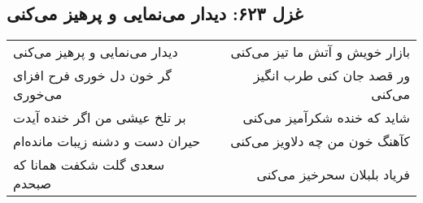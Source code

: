 \begin{center}
\section*{غزل ۶۲۳: دیدار می‌نمایی و پرهیز می‌کنی}
\label{sec:623}
\begin{longtable}{l p{0.5cm} r}
دیدار می‌نمایی و پرهیز می‌کنی
&&
بازار خویش و آتش ما تیز می‌کنی
\\
گر خون دل خوری فرح افزای می‌خوری
&&
ور قصد جان کنی طرب انگیز می‌کنی
\\
بر تلخ عیشی من اگر خنده آیدت
&&
شاید که خنده شکرآمیز می‌کنی
\\
حیران دست و دشنه زیبات مانده‌ام
&&
کآهنگ خون من چه دلاویز می‌کنی
\\
سعدی گلت شکفت همانا که صبحدم
&&
فریاد بلبلان سحرخیز می‌کنی
\\
\end{longtable}
\end{center}
